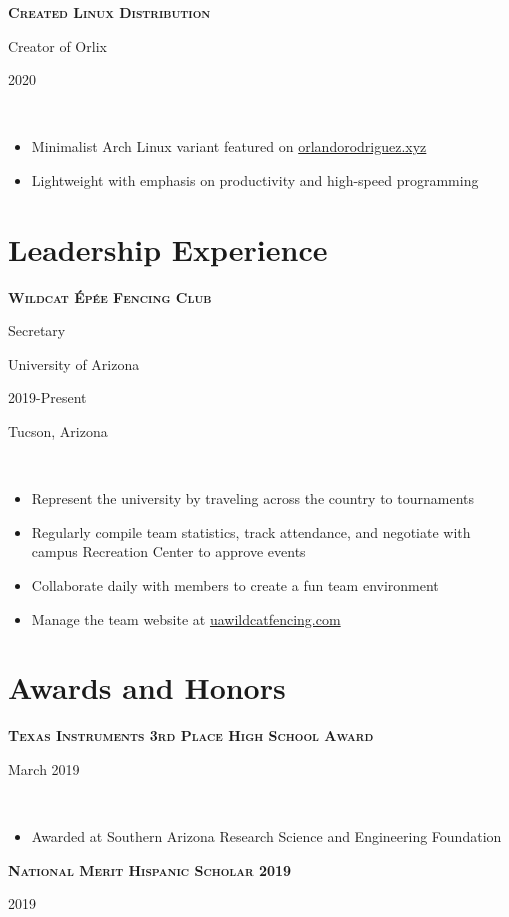 \documentclass[letterpaper,10pt]{article}
\newcommand{\entry}[5]{
    \hfill\vline\hfill
    \begin{minipage}[t]{.80\textwidth}
    
        \textbf{\textsc{#3}}
        
        #4
        
        \footnotesize{#1}
    \end{minipage}
    \hfill\vline\hfill
    \begin{minipage}[t]{.15\textwidth}
        #2
        
        \footnotesize{#5}
    \end{minipage}\\\vspace{.1cm}
}
\newcommand{\ua}{University of Arizona}
\newcommand{\town}{Tucson, Arizona}
\newcommand{\site}{\href{https://www.orlandorodriguez.xyz}{orlandorodriguez.xyz}}
\newcommand{\wcfsite}{\href{https://www.uawildcatfencing.com}{uawildcatfencing.com}}
\begin{document}
\entry{}{2020}{Created Linux Distribution}{Creator of Orlix}{}
\begin{itemize}
    	\item Minimalist Arch Linux variant featured on \site
    	\item Lightweight with emphasis on productivity and high-speed programming
\end{itemize}

\section{Leadership Experience}

\entry{\ua}{2019-Present}{Wildcat Épée Fencing Club}{Secretary}{\town}
\begin{itemize}
    	\item Represent the university by traveling across the country to tournaments 
    	\item Regularly compile team statistics, track attendance, and negotiate with campus Recreation Center to approve events
    	\item Collaborate daily with members to create a fun team environment 
	\item Manage the team website at \wcfsite
\end{itemize}

\section{Awards and Honors}

\entry{}{March 2019}{Texas Instruments 3rd Place High School Award}{}{}
\begin{itemize}
    \item Awarded at Southern Arizona Research Science and Engineering Foundation
\end{itemize}
\entry{}{2019}{National Merit Hispanic Scholar 2019}{}{}
\end{document}
